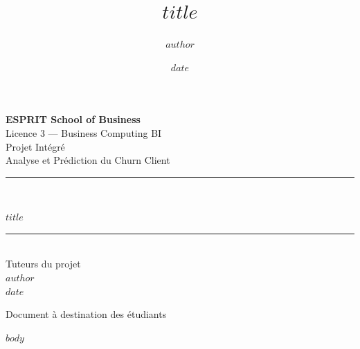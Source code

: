 \documentclass[11pt,a4paper]{article}
\title{\color{primary}\textbf{$title$}}
\author{$author$}
\date{$date$}
\begin{document}
\begin{titlepage}
\centering
\vspace*{1.5cm}

{\Large\bfseries ESPRIT School of Business}\\[0.3cm]
{\large Licence 3 --- Business Computing BI}\\[2cm]

{\color{gray}\large Projet Intégré}\\[0.3cm]
{\color{gray}\large Analyse et Prédiction du Churn Client}\\[2.2cm]

\rule{0.85\linewidth}{1.2pt}\\[0.6cm]
{\Huge\bfseries\color{primary} $title$\par}
\rule{0.85\linewidth}{1.2pt}\\[2cm]

{\large Tuteurs du projet}\\[0.2cm]
{\Large\bfseries $author$}\\[1cm]
{\large $date$}

\vfill
{\color{gray}\small Document à destination des étudiants}
\end{titlepage}

\tableofcontents
\newpage

$body$
\end{document}
